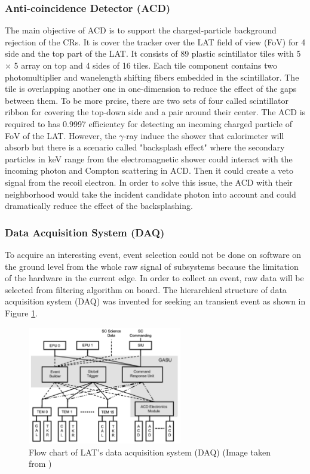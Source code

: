 \subsubsection{Anti-coincidence Detector (ACD)}
The main objective of ACD is to support the charged-particle background 
rejection of the CRs. It is cover the tracker over the LAT field of 
view (FoV) for 4 side and the top part of the LAT. It consists of 
89 plastic scintillator tiles with 5 $\times$ 5 array on top and 
4 sides of 16 tiles. Each tile component contains two photomultiplier 
and wanelength shifting fibers embedded in the scintillator. The tile 
is overlapping another one in one-dimension to reduce the effect of 
the gaps between them. To be more prcise, there are two sets 
of four called scintillator ribbon for covering the top-down side 
and a pair around their center. The ACD is required to has 0.9997 efficientcy 
for detecting an incoming charged particle of FoV of the LAT. However,
the $\gamma$-ray induce the shower that calorimeter will absorb but 
there is a scenario called "backsplash effect" where the secondary 
particles in keV range from the electromagnetic shower could interact 
with the incoming photon and Compton scattering in ACD. Then it could 
create a veto signal from the recoil electron. In order to solve this issue,
the ACD with their neighborhood would take the incident candidate photon 
into account and could dramatically reduce the effect of the backsplashing.


\subsubsection{Data Acquisition System (DAQ)}


To acquire an interesting event, event selection could not be done 
on software on the ground level from the whole raw signal of subsystems because the limitation 
of the hardware in the current edge. In order to collect an event, 
raw data will be selected from filtering algorithm on board.
The hierarchical structure of data acquisition system (DAQ) was invented 
for seeking an transient event as shown in Figure \ref{fig:fermi_daq}.

\begin{figure}[h!]
    \centering
    \includegraphics[width=0.6\textwidth]{content/background/figures/fermi_daq.png}
    \caption{Flow chart of LAT's data acquisition system (DAQ) (Image taken from \cite{FermiLAT})}
    \label{fig:fermi_daq}
\end{figure}

